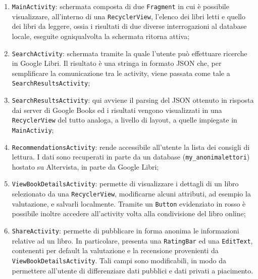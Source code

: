 \documentclass[12pt]{article}
\def\code#1{\texttt{#1}}
\begin{document}
	\begin{enumerate}
		\item \code{MainActivity}: schermata composta di due \code{Fragment} in cui è possibile visualizzare, all'interno di una \code{RecyclerView}, l'elenco dei libri letti e quello dei libri da leggere, ossia i risultati di due diverse interrogazioni al database locale, eseguite ogniqualvolta la schermata ritorna attiva;
		\item \code{SearchActivity}: schermata tramite la quale l'utente può effettuare ricerche in Google Libri. Il risultato è una stringa in formato JSON che, per semplificare la comunicazione tra le activity, viene passata come tale a \code{SearchResultsActivity};
		\item \code{SearchResultsActivity}: qui avviene il parsing del JSON ottenuto in risposta dai server di Google Books ed i risultati vengono visualizzati in una \code{RecyclerView} del tutto analoga, a livello di layout, a quelle impiegate in \code{MainActiviy};
		\item \code{RecommendationsActivity}: rende accessibile all'utente la lista dei consigli di lettura. I dati sono recuperati in parte da un database (\code{my\_anonimalettori}) hostato su Altervista, in parte da Google Libri;
		\item \code{ViewBookDetailsActivity}: permette di visualizzare i dettagli di un libro selezionato da una \code{RecyclerView}, modificarne alcuni attributi, ad esempio la valutazione, e salvarli localmente. Tramite un \code{Button} evidenziato in rosso è possibile inoltre accedere all'activity volta alla condivisione del libro online;
		\item \code{ShareActivity}: permette di pubblicare in forma anonima le informazioni relative ad un libro. In particolare, presenta una \code{RatingBar} ed una \code{EditText}, contenenti per default la valutazione e la recensione provenienti da \code{ViewBookDetailsActivity}. Tali campi sono modificabili, in modo da permettere all'utente di differenziare dati pubblici e dati privati a piacimento.
	\end{enumerate}
\end{document}
